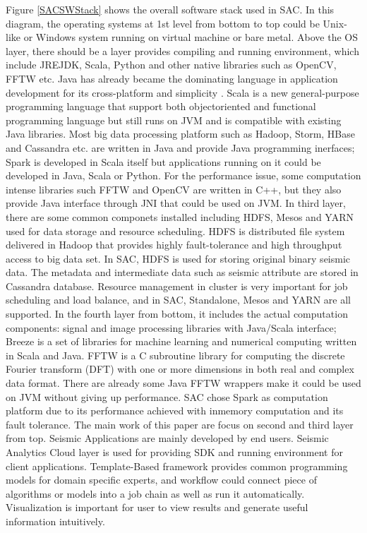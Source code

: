 Figure \ref{SACSWStack} shows the overall software stack used in SAC. In this diagram, the operating systems at 1st level from bottom to top could be Unix-like or Windows system running on virtual machine or bare metal. Above the OS layer, there should be a layer provides compiling and running environment, which include JRE\/JDK, Scala, Python and other native libraries such as OpenCV, FFTW etc. Java has already became the dominating language in application development for its cross-platform and simplicity \cite{Top10Lang}. Scala is a new general-purpose programming language that support both object\-oriented and functional programming language but still runs on JVM and is compatible with existing Java libraries. Most big data processing platform such as Hadoop, Storm, HBase and Cassandra etc. are written in Java and provide Java programming inerfaces; Spark is developed in Scala itself but applications running on it could be developed in Java, Scala or Python. For the performance issue, some computation intense libraries such FFTW and OpenCV are written in C++, but they also provide Java interface through JNI that could be used on JVM. In third layer, there are some common componets installed including HDFS, Mesos and YARN  used for data storage and resource scheduling. HDFS is distributed file system delivered in Hadoop that provides highly fault-tolerance and high throughput access to big data set. In SAC, HDFS is used for storing original binary seismic data. The metadata and intermediate data such as seismic attribute are stored in Cassandra database. Resource management in cluster is very important for job scheduling and load balance, and in SAC, Standalone, Mesos and YARN are all supported. In the fourth layer from bottom, it includes the actual computation components: signal and image processing libraries with Java/Scala interface; Breeze \cite{ScalaNLPBreeze} is a set of libraries for machine learning and numerical computing written in Scala and Java. FFTW \cite{Frigo05thedesign} is a C subroutine library for computing the discrete Fourier transform (DFT) with one or more dimensions in both real and complex data format. There are already some Java FFTW wrappers make it could be used on JVM without giving up performance. SAC chose Spark as computation platform due to its performance achieved with in\-memory computation and its fault tolerance. The main work of this paper are focus on second and third layer from top. Seismic Applications are mainly developed by end users. Seismic Analytics Cloud layer is used for providing SDK and running environment for client applications. Template-Based framework provides common programming models for domain specific experts, and workflow could connect piece of algorithms or models into a job chain as well as run it automatically. Visualization is important for user to view results and generate useful information intuitively.  

